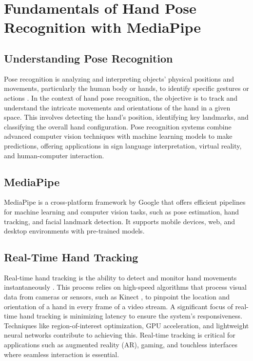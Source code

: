 \chapter{Fundamentals of Hand Pose Recognition with MediaPipe}

\section{Understanding Pose Recognition}
Pose recognition is analyzing and interpreting objects' physical positions and movements, particularly the human body or hands, to identify specific gestures or actions \cite{Yuniarno_2024}. In the context of hand pose recognition, the objective is to track and understand the intricate movements and orientations of the hand in a given space. This involves detecting the hand's position, identifying key landmarks, and classifying the overall hand configuration. Pose recognition systems combine advanced computer vision techniques with machine learning models to make predictions, offering applications in sign language interpretation, virtual reality, and human-computer interaction.
\section{MediaPipe}
MediaPipe is a cross-platform framework by Google that offers efficient pipelines for machine learning and computer vision tasks, such as pose estimation, hand tracking, and facial landmark detection. It supports mobile devices, web, and desktop environments with pre-trained models.
\section{Real-Time Hand Tracking}
Real-time hand tracking is the ability to detect and monitor hand movements instantaneously \cite{9506135}. This process relies on high-speed algorithms that process visual data from cameras or sensors, such as Kinect \cite{SONG2021103055}, to pinpoint the location and orientation of a hand in every frame of a video stream. A significant focus of real-time hand tracking is minimizing latency to ensure the system's responsiveness. Techniques like region-of-interest optimization, GPU acceleration, and lightweight neural networks contribute to achieving this. Real-time tracking is critical for applications such as augmented reality (AR), gaming, and touchless interfaces where seamless interaction is essential.
